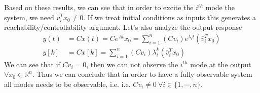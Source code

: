 \documentclass[twoside]{article}
\begin{document}
%
Based on these results, we can see that in order to excite the $i^{th}$ mode the system, we need $\bar{v}_i^T x_0 \neq 0$. If we treat initial conditions 
as inputs this generates a reachability/controllability argument. Let's also analyze the output response
%
\begin{align*}
	y(t) &= C x(t) = C e^{A t} x_0 = \sum\limits_{i=1}^n (C v_i) e^{\lambda_i t} \left( \bar{v}_i^T x_0 \right) 
       \\
	y[k] &= C x[k] 
	= \sum\limits_{i=1}^n (C v_i) \lambda_i^k \left( \bar{v}_i^T x_0 \right) 
\end{align*}
%
We can see that if $C v_i = 0$, then we can not observe the $i^{th}$ mode at the output $\forall x_0 \in \mathbb{R}^{n}$. Thus we can conclude that in order to have a fully 
observable system all modes needs to be observable, i.e. i.e. $C v_i \neq 0 \ \forall i \in \lbrace 1 , \cdots , n \rbrace$.
\end{document}
